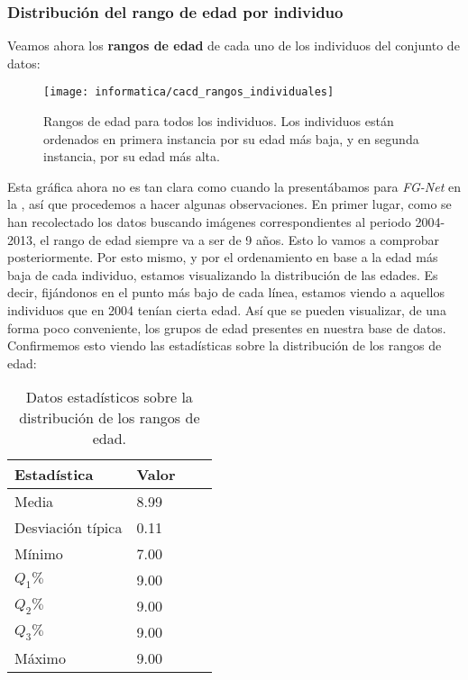 \subsubsection{Distribución del rango de edad por individuo}

Veamos ahora los \textbf{rangos de edad} de cada uno de los individuos del conjunto de datos:

\begin{figure}[!hbtp]
    \centering
    \texttt{[image: informatica/cacd\_rangos\_individuales]}
    \caption{Rangos de edad para todos los individuos. Los individuos están ordenados en primera instancia por su edad más baja, y en segunda instancia, por su edad más alta.}
\end{figure}

Esta gráfica ahora no es tan clara como cuando la presentábamos para \textit{FG-Net} en la , así que procedemos a hacer algunas observaciones. En primer lugar, como se han recolectado los datos buscando imágenes correspondientes al periodo 2004-2013, el rango de edad siempre va a ser de 9 años. Esto lo vamos a comprobar posteriormente. Por esto mismo, y por el ordenamiento en base a la edad más baja de cada individuo, estamos visualizando la distribución de las edades. Es decir, fijándonos en el punto más bajo de cada línea, estamos viendo a aquellos individuos que en 2004 tenían cierta edad. Así que se pueden visualizar, de una forma poco conveniente, los grupos de edad presentes en nuestra base de datos. Confirmemos esto viendo las estadísticas sobre la distribución de los rangos de edad:

\begin{table}[!hbtp]
\centering
\begin{tabular}{|l|l|l|l|}
    \hline
    \textbf{Estadística} & \textbf{Valor} \\
    \hline

    Media             & 8.99 \\
    Desviación típica & 0.11 \\
    Mínimo            & 7.00 \\
    $Q_1 \%$          & 9.00 \\
    $Q_2 \%$          & 9.00 \\
    $Q_3 \%$          & 9.00 \\
    Máximo            & 9.00 \\

    \hline

\end{tabular}
    \caption{Datos estadísticos sobre la distribución de los rangos de edad.}
\end{table}

